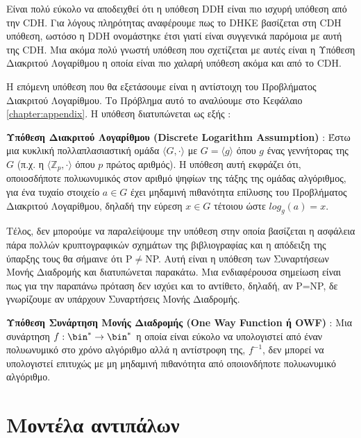 Είναι πολύ εύκολο να αποδειχθεί ότι η υπόθεση DDH είναι πιο ισχυρή υπόθεση από την CDH. Για λόγους πληρότητας αναφέρουμε πως το DHKE βασίζεται στη CDH υπόθεση, ωστόσο η DDH ονομάστηκε έτσι γιατί είναι συγγενικά παρόμοια με αυτή της CDH. Μια ακόμα πολύ γνωστή υπόθεση που σχετίζεται με αυτές είναι η Υπόθεση Διακριτού Λογαρίθμου η οποία είναι πιο χαλαρή υπόθεση ακόμα και από το CDH.

H επόμενη υπόθεση που θα εξετάσουμε είναι η αντίστοιχη του Προβλήματος Διακριτού Λογαρίθμου. Το Πρόβλημα αυτό το αναλύουμε στο Κεφάλαιο \ref{chapter:appendix}. Η υπόθεση διατυπώνεται ως εξής :

\begin{definition}
\textbf{Υπόθεση Διακριτού Λογαρίθμου (Discrete Logarithm Assumption)} : Έστω μια κυκλική πολλαπλασιαστική ομάδα $\langle G, \cdot \rangle$  με $G = \langle g \rangle$ όπου $g$ ένας γεννήτορας της $G$ (π.χ. η $\langle \mathbb{Z}_p, \cdot \rangle$ όπου  $p$ πρώτος αριθμός). Η υπόθεση αυτή εκφράζει ότι, οποιοσδήποτε πολυωνυμικός στον αριθμό ψηφίων της τάξης της ομάδας αλγόριθμος, για ένα τυχαίο στοιχείο $a \in G$ έχει μηδαμινή πιθανότητα επίλυσης του Προβλήματος Διακριτού Λογαρίθμου, δηλαδή την εύρεση $x \in G$ τέτοιου ώστε $log_g(a) = x$.
\end{definition}

Τέλος, δεν μπορούμε να παραλείψουμε την υπόθεση στην οποία βασίζεται η ασφάλεια πάρα πολλών κρυπτογραφικών σχημάτων της βιβλιογραφίας και η απόδειξη της ύπαρξης τους θα σήμαινε ότι P$\ne$NP. Αυτή είναι η υπόθεση των Συναρτήσεων Μονής Διαδρομής και διατυπώνεται παρακάτω. Μια ενδιαφέρουσα σημείωση είναι πως για την παραπάνω πρόταση δεν ισχύει και το αντίθετο, δηλαδή, αν P=NP, δε γνωρίζουμε αν υπάρχουν Συναρτήσεις Μονής Διαδρομής.

\begin{definition}
\textbf{Υπόθεση Συνάρτηση Μονής Διαδρομής (One Way Function ή OWF)} : Μια συνάρτηση  $f : \bin^{*} \rightarrow \bin^{*}$ η οποία είναι εύκολο να υπολογιστεί από έναν πολυωνυμικό στο χρόνο αλγόριθμο αλλά η αντίστροφη της, $f^{-1}$, δεν μπορεί να υπολογιστεί επιτυχώς με μη μηδαμινή πιθανότητα από οποιονδήποτε πολυωνυμικό αλγόριθμο.
\end{definition}

\section{Μοντέλα αντιπάλων}

